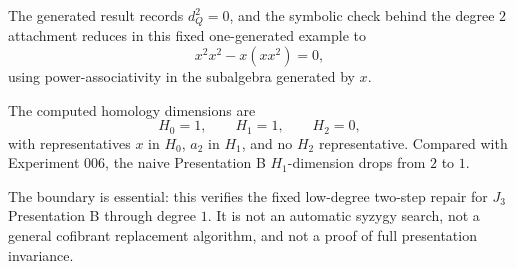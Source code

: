 The generated result records \(d_Q^2=0\), and the symbolic check behind the
degree \(2\) attachment reduces in this fixed one-generated example to
\[
  x^2x^2 - x(xx^2)=0,
\]
using power-associativity in the subalgebra generated by \(x\).

The computed homology dimensions are
\[
  H_0=1,\qquad H_1=1,\qquad H_2=0,
\]
with representatives \(x\) in \(H_0\), \(a_2\) in \(H_1\), and no \(H_2\)
representative. Compared with Experiment 006, the naive Presentation B
\(H_1\)-dimension drops from \(2\) to \(1\).

The boundary is essential: this verifies the fixed low-degree two-step repair
for \(J_3\) Presentation B through degree \(1\). It is not an automatic syzygy
search, not a general cofibrant replacement algorithm, and not a proof of full
presentation invariance.
